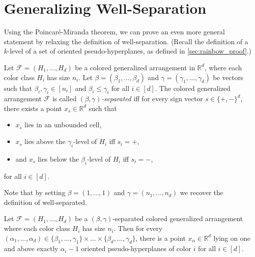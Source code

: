 \section{Generalizing Well-Separation}\label{sec:generalized_separation}
Using the Poincar\'{e}-Miranda theorem, we can prove an even more general statement by relaxing the definition of well-separation. (Recall the definition of a $k$-level of a set of oriented pseudo-hyperplanes, as defined in \cref{sec:rainbow_proof}.) 
%
\begin{definition}
\label{def:generalized_separation}
Let $\mathcal{F}=(H_1, \dots, H_d)$ be a colored generalized arrangement in $\mathbb{R}^d$, where each color class $H_i$ has size $n_i$. Let $\beta=(\beta_1,\ldots,\beta_d)$ and $\gamma=(\gamma_1,\ldots,\gamma_d)$ be vectors such that $\beta_i, \gamma_i \in [n_i]$ and $\beta_i\leq \gamma_i$ for all $i \in [d]$.
The colored generalized arrangement $\mathcal{F}$ is called \emph{$(\beta,\gamma)$-separated} iff for every sign vector $s \in \{+, -\}^d$, there exists a point $x_s \in \mathbb{R}^d$ such that 
\begin{itemize}
	\item $x_s$ lies in an unbounded cell,
    \item $x_s$ lies above the $\gamma_i$-level of $H_i$ iff $s_i = +$,
    \item and $x_s$ lies below the $\beta_i$-level of $H_i$ iff $s_i = -$,
\end{itemize}
for all $i \in [d]$.
\end{definition}
%
Note that by setting $\beta=(1,\ldots, 1)$ and $\gamma=(n_1,\ldots,n_d)$ we recover the definition of well-separated.
%
\begin{theorem}
\label{thm:beta-gamma}
Let $\mathcal{F}=(H_1, \ldots,H_d)$ be a $(\beta,\gamma)$-separated colored generalized arrangement where each color class $H_i$ has size $n_i$. Then for every $(\alpha_1, \dots, \alpha_d) \in \{\beta_1,\ldots,\gamma_1\} \times \dots \times \{\beta_d,\ldots,\gamma_d\}$, there is a point $x_{\alpha} \in \mathbb{R}^d$ lying on one and above exactly $\alpha_i - 1$ oriented pseudo-hyperplanes of color $i$ for all $i \in [d]$.
\end{theorem}
%
